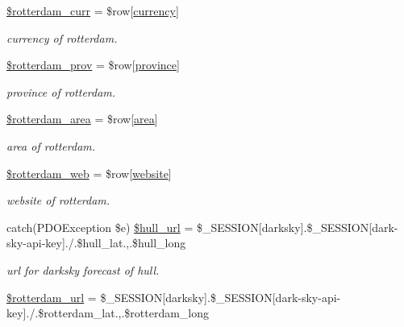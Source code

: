 \begin{DoxyCompactItemize}
\mbox{\hyperlink{index_8php_a34d2fd40789c8407df48306bcd61a785}{\$rotterdam\+\_\+curr}} = \$row\mbox{[}\textquotesingle{}\mbox{\hyperlink{index_8php_abd84e0698c321abdbf211d5b8425d0b5}{currency}}\textquotesingle{}\mbox{]}
\begin{DoxyCompactList}\small\item\em currency of rotterdam. \end{DoxyCompactList}\item 
\mbox{\hyperlink{index_8php_abc96df293e0693d8819f0d9f9b239dfe}{\$rotterdam\+\_\+prov}} = \$row\mbox{[}\textquotesingle{}\mbox{\hyperlink{index_8php_a38d70414c65575df5643ad4296c9db2e}{province}}\textquotesingle{}\mbox{]}
\begin{DoxyCompactList}\small\item\em province of rotterdam. \end{DoxyCompactList}\item 
\mbox{\hyperlink{index_8php_a9322b687154ace187cdafd89421852c4}{\$rotterdam\+\_\+area}} = \$row\mbox{[}\textquotesingle{}\mbox{\hyperlink{index_8php_a5198216176428aa2303311f956213f33}{area}}\textquotesingle{}\mbox{]}
\begin{DoxyCompactList}\small\item\em area of rotterdam. \end{DoxyCompactList}\item 
\mbox{\hyperlink{index_8php_a1590932cbcc34b305f9b67f5cf5fce87}{\$rotterdam\+\_\+web}} = \$row\mbox{[}\textquotesingle{}\mbox{\hyperlink{index_8php_a8c56014cff17c1ced653aa98455da680}{website}}\textquotesingle{}\mbox{]}
\begin{DoxyCompactList}\small\item\em website of rotterdam. \end{DoxyCompactList}\item 
catch(P\+D\+O\+Exception \$e) \mbox{\hyperlink{index_8php_a58f6123edc9a89eb61455c98ec3bb15d}{\$hull\+\_\+url}} = \$\+\_\+\+S\+E\+S\+S\+I\+ON\mbox{[}\textquotesingle{}darksky\textquotesingle{}\mbox{]}.\$\+\_\+\+S\+E\+S\+S\+I\+ON\mbox{[}\textquotesingle{}dark-\/sky-\/api-\/key\textquotesingle{}\mbox{]}.\textquotesingle{}/\textquotesingle{}.\$hull\+\_\+lat.\textquotesingle{},\textquotesingle{}.\$hull\+\_\+long
\begin{DoxyCompactList}\small\item\em url for darksky forecast of hull. \end{DoxyCompactList}\item 
\mbox{\hyperlink{index_8php_adeffa649498546844bc0e7421bd4b140}{\$rotterdam\+\_\+url}} = \$\+\_\+\+S\+E\+S\+S\+I\+ON\mbox{[}\textquotesingle{}darksky\textquotesingle{}\mbox{]}.\$\+\_\+\+S\+E\+S\+S\+I\+ON\mbox{[}\textquotesingle{}dark-\/sky-\/api-\/key\textquotesingle{}\mbox{]}.\textquotesingle{}/\textquotesingle{}.\$rotterdam\+\_\+lat.\textquotesingle{},\textquotesingle{}.\$rotterdam\+\_\+long

\end{DoxyCompactItemize}
